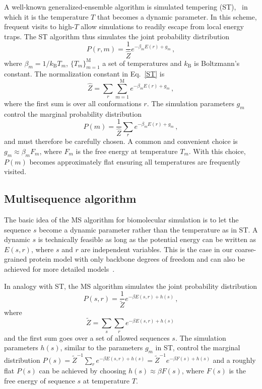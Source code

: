 \documentclass[%
 aip,
rsi,%
 amsmath,amssymb,
 reprint,%
]{revtex4-1}
\newcommand	 {\sbar}	{{s}}
\newcommand	 {\rbar}	{{r}}
\begin{document}
A well-known generalized-ensemble algorithm is simulated tempering (ST),~\cite{Marinari1992,Lyubartsev1992} in which it is the temperature $T$ that becomes a dynamic parameter. In this scheme, frequent visits to high-$T$ allow simulations to readily escape from local energy traps. The ST algorithm thus simulates the joint probability distribution 
\begin{equation}
P(\rbar,m) =\dfrac{1}{\hat{Z}} e^{-\beta_m E(\rbar) + g_m}\,,
\label{ST}
\end{equation}
where  $\beta_m=1/k_\mathrm{B} T_m$, $\{T_m\}_{m=1}^\mathrm{M}$ a set of temperatures and $k_\mathrm{B}$ is Boltzmann's constant. The normalization constant in Eq.~\ref{ST} is  
\begin{equation}
\hat{Z} = \sum_r \sum_{m=1}^{\mathrm{M}}e^{-\beta_m E(\rbar) + g_m}\,,
\end{equation}
where the first sum is over all conformations $\rbar$. The simulation parameters $g_m$ control the marginal probability distribution
\begin{equation}
P(m) = \frac{1}{\hat{Z}}\sum_r e^{-\beta_m E(\rbar) + g_m} \,,
\end{equation}
and must therefore be carefully chosen. A common and convenient choice is $g_m\approx \beta_m F_m$, where $F_m$ is the free energy at temperature $T_m$. With this choice, $P(m)$ becomes approximately flat ensuring all temperatures are frequently visited. 

\subsection{Multisequence algorithm}
\noindent 
The basic idea of the MS algorithm for biomolecular simulation is to let the sequence $\sbar$ become a dynamic parameter rather than the temperature as in ST. A dynamic $\sbar$ is technically feasible as long as the potential energy can be written as $E(\sbar,\rbar)$, where $\sbar$ and $\rbar$ are independent variables. This is the case in our coarse-grained protein model with only backbone degrees of freedom and can also be achieved for more detailed  models~\cite{Bhattacherjee2013,Wallin2017}. 

In analogy with ST, the MS algorithm simulates the joint probability distribution
\begin{equation}
P(\sbar,\rbar) =\dfrac{1}{\tilde{Z}}e^{-\beta E(\sbar,\rbar) + h(\sbar)}\,, 
\label{MS}
\end{equation}
where  
\begin{equation}
\tilde{Z} = \sum_{\sbar}\sum_{\rbar} e^{-\beta E(\sbar,\rbar)+ h(\sbar)}\,
\end{equation}
and the first sum goes over a set of allowed sequences $\sbar$. The simulation parameters $h(\sbar)$, similar to the parameters $g_m$ in ST, control the marginal distribution $P(\sbar)=\tilde{Z}^{-1}\sum_{\rbar} e^{-\beta E(\sbar,\rbar)+ h(\sbar)} = \tilde{Z}^{-1}e^{-\beta F(\sbar)+ h(\sbar)}$ and a roughly flat $P(\sbar)$ can be achieved by choosing $h(\sbar) \approx \beta F(\sbar)$, where $F(\sbar)$ is the free energy of sequence $\sbar$ at temperature $T$. 
\end{document}
